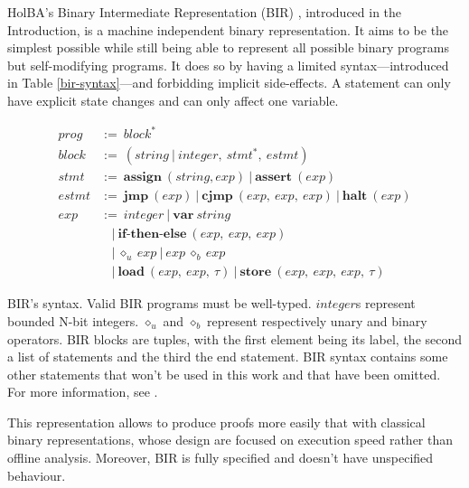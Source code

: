 \documentclass{kththesis}
\begin{document}
HolBA's Binary Intermediate Representation (BIR) \cite{lindner_trabin:_2019}, introduced in the Introduction, is a machine independent binary representation. It aims to be the simplest possible while still being able to represent all possible binary programs but self-modifying programs. It does so by having a limited syntax---introduced in Table \ref{bir-syntax}---and forbidding implicit side-effects. A statement can only have explicit state changes and can only affect one variable.

\begin{table}[h!]
	\begin{align*}
		prog   & :=~block^{\ast}                                                             \\
		block  & :=~(string~|~integer,~stmt^{\ast},~estmt)                                   \\
		stmt   & :=~\textbf{assign}~(string, exp)~|~\textbf{assert}~(exp)                    \\
        estmt  & :=~\textbf{jmp}~(exp)~|~\textbf{cjmp}~(exp,~exp,~exp)~|~\mathbf{halt}~(exp) \\
		exp    & :=~integer~|~\textbf{var}~string                                            \\
		       & ~~~~|~\textbf{if-then-else}~(exp,~exp,~exp)                                 \\
		       & ~~~~|~\diamond_{u}~exp~|~exp~\diamond_{b}~exp~                              \\
		       & ~~~~|~\textbf{load}~(exp,~exp,~\tau)~|~\textbf{store}~(exp,~exp,~exp,~\tau) 
	\end{align*}
	\caption{BIR's syntax. Valid BIR programs must be well-typed. $integer$s represent bounded N-bit integers. $\diamond_{u}$ and $\diamond_{b}$ represent respectively unary and binary operators. BIR blocks are tuples, with the first element being its label, the second a list of statements and the third the end statement. BIR syntax contains some other statements that won't be used in this work and that have been omitted. For more information, see \cite{lindner_trabin:_2019}.}
	\label{bir-syntax}
\end{table}

This representation allows to produce proofs more easily that with classical binary representations, whose design are focused on execution speed rather than offline analysis. Moreover, BIR is fully specified and doesn't have unspecified behaviour.
\end{document}
